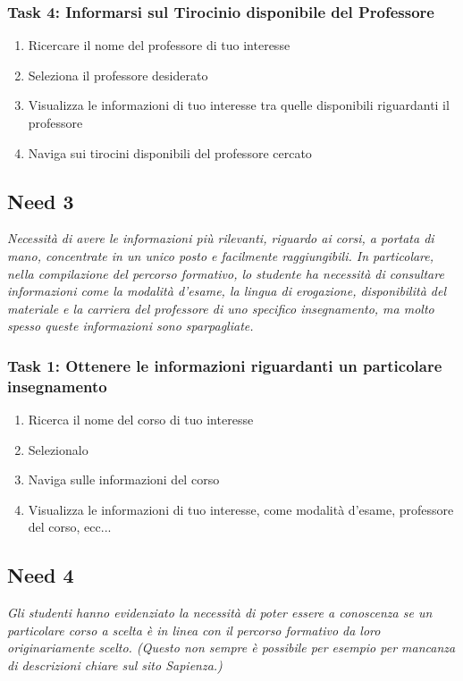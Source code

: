 \subsubsection{Task 4: Informarsi sul Tirocinio disponibile del Professore}
\begin{enumerate}
    \item Ricercare il nome del professore di tuo interesse
    \item Seleziona il professore desiderato
    \item Visualizza le informazioni di tuo interesse tra quelle disponibili riguardanti il professore
    \item Naviga sui tirocini disponibili del professore cercato
\end{enumerate} 

\subsection{Need 3}
\begin{center}
    \textit{Necessità di avere le informazioni più rilevanti, riguardo ai corsi, a portata di mano, concentrate in un unico posto e facilmente raggiungibili.
    In particolare, nella compilazione del percorso formativo, lo studente ha necessità di consultare informazioni come la modalità d’esame, la lingua di erogazione, disponibilità del materiale e la carriera del professore di uno specifico insegnamento, ma molto spesso queste informazioni sono sparpagliate.}
\end{center}
\subsubsection{Task 1: Ottenere le informazioni riguardanti un particolare insegnamento}
\begin{enumerate}
    \item Ricerca il nome del corso di tuo interesse
    \item Selezionalo
    \item Naviga sulle informazioni del corso
    \item Visualizza le informazioni di tuo interesse, come modalità d’esame, professore del corso, ecc...
\end{enumerate}


\subsection{Need 4}
\begin{center}
    \textit{Gli studenti hanno evidenziato la necessità di poter essere a conoscenza se un particolare corso a scelta è in linea con il percorso formativo da loro originariamente scelto. (Questo non sempre è possibile per esempio per mancanza di descrizioni chiare sul sito Sapienza.)    }
\end{center}
